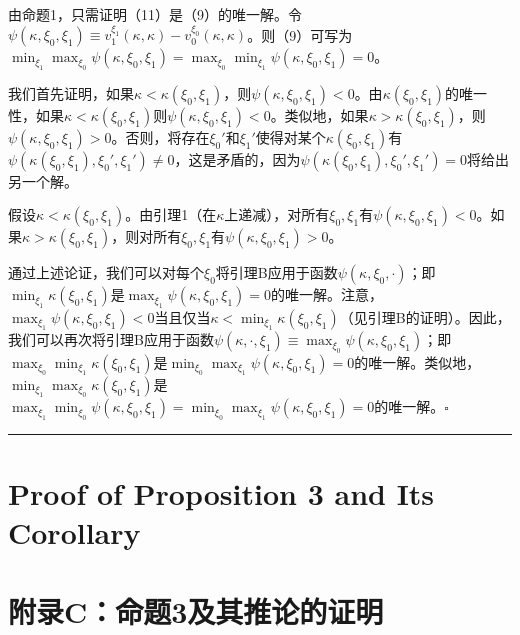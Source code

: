 \documentclass[12pt,a4paper]{article}
\newenvironment{translation}
  {\par\noindent\color{darkblue}\ignorespaces}
  {\par\medskip\noindent\hrule\par\medskip}
\theoremstyle{definition}
\theoremstyle{remark}
\begin{document}
\begin{translation}
由命题1，只需证明（11）是（9）的唯一解。令$\psi(\kappa, \xi_0, \xi_1) \equiv v_1^{\xi_1}(\kappa, \kappa) - v_0^{\xi_0}(\kappa, \kappa)$。则（9）可写为$\min_{\xi_1} \max_{\xi_0} \psi(\kappa, \xi_0, \xi_1) = \max_{\xi_0} \min_{\xi_1} \psi(\kappa, \xi_0, \xi_1) = 0$。

我们首先证明，如果$\kappa < \kappa(\xi_0, \xi_1)$，则$\psi(\kappa, \xi_0, \xi_1) < 0$。由$\kappa(\xi_0, \xi_1)$的唯一性，如果$\kappa < \kappa(\xi_0, \xi_1)$则$\psi(\kappa, \xi_0, \xi_1) < 0$。类似地，如果$\kappa > \kappa(\xi_0, \xi_1)$，则$\psi(\kappa, \xi_0, \xi_1) > 0$。否则，将存在$\xi_0'$和$\xi_1'$使得对某个$\kappa(\xi_0, \xi_1)$有$\psi(\kappa(\xi_0, \xi_1), \xi_0', \xi_1') \ne 0$，这是矛盾的，因为$\psi(\kappa(\xi_0, \xi_1), \xi_0', \xi_1') = 0$将给出另一个解。

假设$\kappa < \kappa(\xi_0, \xi_1)$。由引理1（在$\kappa$上递减），对所有$\xi_0, \xi_1$有$\psi(\kappa, \xi_0, \xi_1) < 0$。如果$\kappa > \kappa(\xi_0, \xi_1)$，则对所有$\xi_0, \xi_1$有$\psi(\kappa, \xi_0, \xi_1) > 0$。

通过上述论证，我们可以对每个$\xi_0$将引理B应用于函数$\psi(\kappa, \xi_0, \cdot)$；即$\min_{\xi_1} \kappa(\xi_0, \xi_1)$是$\max_{\xi_1} \psi(\kappa, \xi_0, \xi_1) = 0$的唯一解。注意，$\max_{\xi_1} \psi(\kappa, \xi_0, \xi_1) < 0$当且仅当$\kappa < \min_{\xi_1} \kappa(\xi_0, \xi_1)$（见引理B的证明）。因此，我们可以再次将引理B应用于函数$\psi(\kappa, \cdot, \xi_1) \equiv \max_{\xi_0} \psi(\kappa, \xi_0, \xi_1)$；即$\max_{\xi_0} \min_{\xi_1} \kappa(\xi_0, \xi_1)$是$\min_{\xi_0} \max_{\xi_1} \psi(\kappa, \xi_0, \xi_1) = 0$的唯一解。类似地，$\min_{\xi_1} \max_{\xi_0} \kappa(\xi_0, \xi_1)$是$\max_{\xi_1} \min_{\xi_0} \psi(\kappa, \xi_0, \xi_1) = \min_{\xi_0} \max_{\xi_1} \psi(\kappa, \xi_0, \xi_1) = 0$的唯一解。$\square$
\end{translation}

\section{Proof of Proposition 3 and Its Corollary}
\section*{\color{darkblue}附录C：命题3及其推论的证明}
\end{document}
